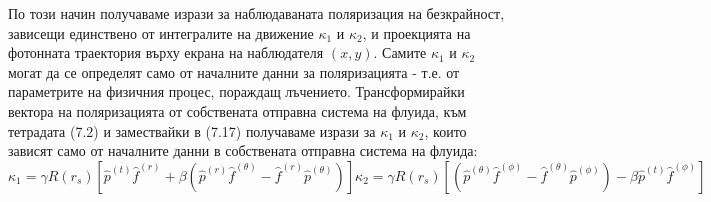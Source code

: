 По този начин получаваме изрази за наблюдаваната поляризация на безкрайност, зависещи единствено от интегралите на движение $\kappa_1$ и $\kappa_2$, и проекцията на фотонната траектория върху екрана на наблюдателя $(x,y)$. Самите $\kappa_1$ и $\kappa_2$ могат да се определят само от началните данни за поляризацията - т.е. от параметрите на физичния процес, пораждащ лъчението. Трансформирайки вектора на поляризацията от собствената отправна система на флуида, към тетрадата (7.2) и замествайки в (7.17) получаваме изрази за $\kappa_1$ и $\kappa_2$, които зависят само от началните данни в собствената отправна система на флуида:
\begin{subequations}
	\begin{equation}
		\kappa_1 = \gamma R(r_s)\left[\hat{p}^{(t)}\hat{f}^{(r)} + \beta\left(\hat{p}^{(r)}\hat{f}^{(\theta)} - \hat{f}^{(r)}\hat{p}^{(\theta)}\right)\right]
	\end{equation}
	\begin{equation}
		\kappa_2 = \gamma R(r_s)\left[\left(\hat{p}^{(\theta)}\hat{f}^{(\phi)} - \hat{f}^{(\theta)}\hat{p}^{(\phi)}\right) - \beta \hat{p}^{(t)} \hat{f}^{(\phi)}\right]
	\end{equation}
\end{subequations}

